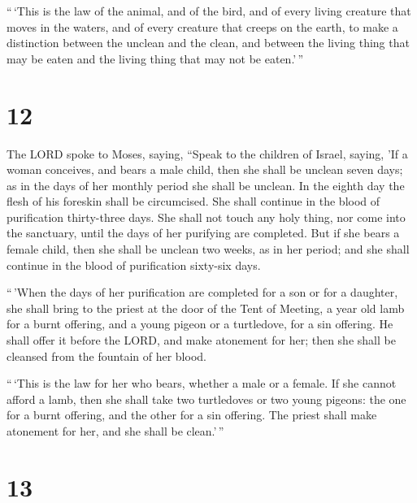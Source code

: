  ``\,`This is the law of the animal, and of the bird, and
of every living creature that moves in the waters, and of every creature
that creeps on the earth,  to make a distinction between
the unclean and the clean, and between the living thing that may be
eaten and the living thing that may not be eaten.'\,''

\hypertarget{section-11}{%
\section{12}\label{section-11}}

 The LORD spoke to Moses, saying,  ``Speak
to the children of Israel, saying, 'If a woman conceives, and bears a
male child, then she shall be unclean seven days; as in the days of her
monthly period she shall be unclean.  In the eighth day
the flesh of his foreskin shall be circumcised.  She shall
continue in the blood of purification thirty-three days. She shall not
touch any holy thing, nor come into the sanctuary, until the days of her
purifying are completed.  But if she bears a female child,
then she shall be unclean two weeks, as in her period; and she shall
continue in the blood of purification sixty-six days.

 ``\,'When the days of her purification are completed for
a son or for a daughter, she shall bring to the priest at the door of
the Tent of Meeting, a year old lamb for a burnt offering, and a young
pigeon or a turtledove, for a sin offering.  He shall
offer it before the LORD, and make atonement for her; then she shall be
cleansed from the fountain of her blood.

``\,`This is the law for her who bears, whether a male or a female.
 If she cannot afford a lamb, then she shall take two
turtledoves or two young pigeons: the one for a burnt offering, and the
other for a sin offering. The priest shall make atonement for her, and
she shall be clean.'\,''

\hypertarget{section-12}{%
\section{13}\label{section-12}}

